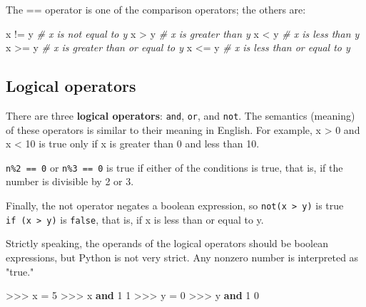 \documentclass[11pt]{article}
\newenvironment{Shaded}{}{}
\newcommand{\KeywordTok}[1]{\textcolor[rgb]{0.00,0.44,0.13}{\textbf{{#1}}}}
\newcommand{\DecValTok}[1]{\textcolor[rgb]{0.25,0.63,0.44}{{#1}}}
\newcommand{\CommentTok}[1]{\textcolor[rgb]{0.38,0.63,0.69}{\textit{{#1}}}}
\newcommand{\NormalTok}[1]{{#1}}
\newcommand{\OperatorTok}[1]{\textcolor[rgb]{0.40,0.40,0.40}{{#1}}}
\begin{document}
The == operator is one of the comparison operators; the others are:

\begin{Shaded}
\begin{Highlighting}[]
\NormalTok{x }\OperatorTok{!=}\NormalTok{ y               }\CommentTok{# x is not equal to y }
\NormalTok{x }\OperatorTok{>}\NormalTok{ y                }\CommentTok{# x is greater than y }
\NormalTok{x }\OperatorTok{<}\NormalTok{ y                }\CommentTok{# x is less than y }
\NormalTok{x }\OperatorTok{>=}\NormalTok{ y               }\CommentTok{# x is greater than or equal to y }
\NormalTok{x }\OperatorTok{<=}\NormalTok{ y               }\CommentTok{# x is less than or equal to y }
\end{Highlighting}
\end{Shaded}

    \subsection{Logical operators}\label{logical-operators}

There are three \textbf{logical operators}: \texttt{and}, \texttt{or},
and \texttt{not}. The semantics (meaning) of these operators is similar
to their meaning in English. For example, x \textgreater{} 0 and x
\textless{} 10 is true only if x is greater than 0 and less than 10.

\texttt{n\%2\ ==\ 0} or \texttt{n\%3\ ==\ 0} is true if either of the
conditions is true, that is, if the number is divisible by 2 or 3.

Finally, the not operator negates a boolean expression, so
\texttt{not(x\ \textgreater{}\ y)} is true
\texttt{if\ (x\ \textgreater{}\ y)} is \texttt{false}, that is, if x is
less than or equal to y.

Strictly speaking, the operands of the logical operators should be
boolean expressions, but Python is not very strict. Any nonzero number
is interpreted as "true."

\begin{Shaded}
\begin{Highlighting}[]
\OperatorTok{>>>}\NormalTok{  x }\OperatorTok{=} \DecValTok{5} 
\OperatorTok{>>>}\NormalTok{  x }\KeywordTok{and} \DecValTok{1} 
\DecValTok{1} 
\OperatorTok{>>>}\NormalTok{  y }\OperatorTok{=} \DecValTok{0} 
\OperatorTok{>>>}\NormalTok{  y }\KeywordTok{and} \DecValTok{1} 
\DecValTok{0}
\end{Highlighting}
\end{Shaded}
\end{document}
